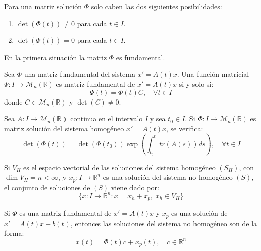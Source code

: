 \begin{corollary}
    Para una matriz solución $\Phi$ solo caben las dos siguientes posibilidades:
    \begin{enumerate}
        \item $\det(\Phi(t)) \neq 0$ para cada $t \in I$.
        \item $\det(\Phi(t)) = 0$ para cada $t \in I$.
    \end{enumerate}
    En la primera situación la matriz $\Phi$ es fundamental.
\end{corollary}

\begin{proposition}
    Sea $\Phi$ una matriz fundamental del sistema $x' = A(t)x$.
    Una función matricial $\Psi: I \to \mathcal{M}_n(\mathbb{R})$ es matriz fundamental de $x' = A(t)x$ si y solo si:
    $$\Psi(t) = \Phi(t)C, \quad \forall t \in I$$
    donde $C \in \mathcal{M}_n(\mathbb{R})$ y $\det(C) \neq 0$.
\end{proposition}

\begin{theorem}
    Sea $A: I \to \mathcal{M}_n(\mathbb{R})$ continua en el intervalo $I$ y sea $t_0 \in I$.
    Si $\Phi: I \to \mathcal{M}_n(\mathbb{R})$ es matriz solución del sistema homogéneo $x' = A(t)x$, se verifica:
    $$\det(\Phi(t)) = \det(\Phi(t_0)) \exp\left( \int_{t_0}^t tr(A(s))ds \right), \quad \forall t \in I$$
\end{theorem}

\begin{proposition}
    Si $V_H$ es el espacio vectorial de las soluciones del sistema homogéneo $(S_H)$, con $\dim V_H = n < \infty$, y $x_p: I \to \mathbb{R}^n$ es una solución del sistema no homogéneo $(S)$, el conjunto de soluciones de $(S)$ viene dado por:
    $$\{x: I \to \mathbb{R}^n : x = x_h + x_p, \; x_h \in V_H\}$$
\end{proposition}

\begin{corollary}
    Si $\Phi$ es una matriz fundamental de $x' = A(t)x$ y $x_p$ es una solución de $x' = A(t)x + b(t)$, entonces las soluciones del sistema no homogéneo son de la forma:
    $$x(t) = \Phi(t)c + x_p(t), \quad c \in \mathbb{R}^n$$
\end{corollary}